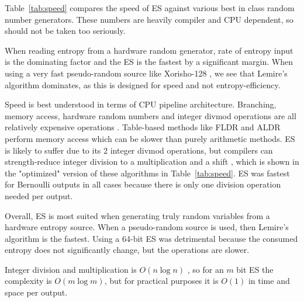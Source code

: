 \documentclass[12pt]{article}
\begin{document}
Table~\ref{tab:speed} compares the speed of ES against various best in class random number generators. These numbers are heavily compiler and CPU dependent, so should not be taken too seriously.

When reading entropy from a hardware random generator, rate of entropy input is the dominating factor and the ES is the fastest by a significant margin. When using a very fast pseudo-random source like Xorisho-128 \cite{blackman21}, we see that Lemire's algorithm \cite{lemire2019fast} dominates, as this is designed for speed and not entropy-efficiency.

Speed is best understood in terms of CPU pipeline architecture. Branching, memory access, hardware random numbers and integer divmod operations are all relatively expensive operations \cite{Abel19a}. Table-based methods like FLDR \cite{saad2020fldr} and ALDR \cite{saad2025} perform memory access which can be slower than purely arithmetic methods. ES is likely to suffer due to its 2 integer divmod operations, but compilers can strength-reduce integer division to a multiplication and a shift \cite{granlund94}, which is shown in the "optimized" version of these algorithms in Table~\ref{tab:speed}. ES was fastest for Bernoulli outputs in all cases because there is only one division operation needed per output.

Overall, ES is most suited when generating truly random variables from a hardware entropy source. When a pseudo-random source is used, then Lemire's algorithm is the fastest. Using a 64-bit ES was detrimental because the consumed entropy does not significantly change, but the operations are slower.

Integer division and multiplication is $O(n \log n)$ \cite{harvey2021integer}, so for an $m$ bit ES the complexity is $O(m \log m)$, but for practical purposes it is $O(1)$ in time and space per output.
\end{document}

